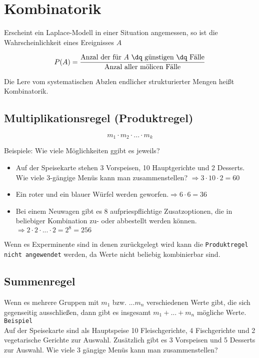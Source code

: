 \section{Kombinatorik}
Erscheint ein Laplace-Modell in einer Situation angemessen, so ist die Wahrscheinlichkeit eines Ereignisses $A$

\[P(A)=\frac{\textrm{Anzal der für $A$ \dq günstigen \dq Fälle}}{\textrm{Anzal aller mölicen Fälle}} \]

Die Lere vom systematischen Abzlen endlicher \dq strukturierter \dq Mengen heißt Kombinatorik.

\subsection{Multiplikationsregel (Produktregel)}

\[m_1\cdot m_2 \cdot ... \cdot m_k\]

Beispiele: Wie viele Möglichkeiten ggibt es jeweils?\\

\begin{itemize}
    \item Auf der Speisekarte stehen 3 Vorspeisen, 10 Hauptgerichte und 2 Desserts. Wie viele 3-gängige Menüs kann man zusammenstellen? $\Longrightarrow 3\cdot 10\cdot 2 = 60$
    \item Ein roter und ein blauer Würfel werden geworfen.$\Longrightarrow 6\cdot 6=36$
    \item Bei einem Neuwagen gibt es 8 aufpriespflichtige Zusatzoptionen, die in beliebiger Kombination zu- oder abbestellt werden können.$\Longrightarrow 2\cdot 2\cdot ...\cdot 2 = 2^8=256$
\end{itemize}

Wenn es Experminente sind in denen zurückgelegt wird kann die \texttt{Produktregel nicht angewendet} werden, da Werte nicht beliebig kombinierbar sind.


\subsection{Summenregel}

Wenn es mehrere Gruppen mit $m_1$ bzw. $...m_n$ verschiedenen Werte gibt, die sich gegenseitig ausschließen, dann gibt es insgesamt $m_1+...+m_n$ mögliche Werte.\\

\texttt{Beispiel}\\
Auf der Speisekarte sind als Hauptspeise 10 Fleischgerichte, 4 Fischgerichte und 2 vegetarische Gerichte zur Auswahl. Zusätzlich gibt es 3 Vorspeisen und 5 Desserts zur Auswahl. Wie viele 3 gängige Menüs kann man zusammenstellen?

